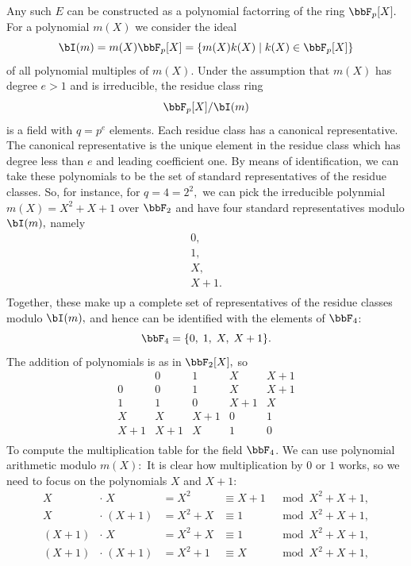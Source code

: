 Any such $E$ can be constructed as a polynomial factorring of the ring $\bbF_p[X].$
For a polynomial $m(X)$ we consider the ideal 
$$
\bI(m) = m(X)\bbF_p[X] = \{m(X)k(X) \mid k(X) \in \bbF_p[X] \} 
$$
of all polynomial multiples of $m(X).$
Under the assumption that $m(X)$ has degree $e > 1$ and is irreducible, 
the residue class ring 
$$
\bbF_p[X]/ \bI(m)
$$
is a field with $q = p^e$ elements.
Each residue class has a canonical representative. The canonical representative is the unique element 
in the residue class which has degree less than $e$ and leading coefficient one. 
By means of identification, we can take these polynomials to be the set of standard representatives 
of the residue classes. 
So, for instance, for $q = 4 = 2^2,$ we can pick the irreducible polynmial 
$m(X) = X^2+X+1$ over $\bbF_2$ and have four standard representatives modulo $\bI(m),$ namely
$$
\begin{array}{c}
0, \\
1, \\
X, \\
X + 1.\\
\end{array}
$$
Together, these make up a complete set of representatives of the residue classes modulo  $\bI(m),$ 
and hence can be identified with the elements of $\bbF_4$:
$$
\bbF_4 = \{0, \; 1, \; X, \; X+1 \}.
$$
The addition of polynomials is as in $\bbF_2[X],$ so 
$$
\begin{array}{c|cccc}
 & 0 & 1 & X & X + 1 \\
\hline
0 & 0 & 1 & X & X + 1\\
1 & 1 & 0 & X+1 & X \\
X & X & X + 1 & 0 & 1 \\
X + 1 & X + 1 & X & 1 & 0 \\
\end{array}
$$
To compute the multiplication table for the field $\bbF_4$.
We can use polynomial arithmetic modulo $m(X):$
It is clear how multiplication by $0$ or $1$ works, so we need to focus on the 
polynomials $X$ and $X+1$:
$$
\begin{array}{lllll}
X &\cdot\; X &= X^2 &\equiv X + 1 &\mod X^2 + X + 1, \\
X &\cdot\; (X+1) &= X^2+X &\equiv 1 &\mod X^2 + X + 1, \\
(X+1) &\cdot\; X &= X^2+X &\equiv 1 &\mod X^2 + X + 1, \\
(X+1) &\cdot\; (X+1) &= X^2+1 &\equiv X &\mod X^2 + X + 1, \\
\end{array}
$$
